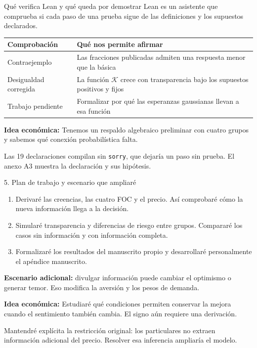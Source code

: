 \documentclass[aspectratio=169,11pt]{beamer}
\newcommand{\idea}[1]{\par\medskip\textbf{Idea económica:} #1}
\begin{document}
\begin{frame}{Qué verifica Lean y qué queda por demostrar}
 Lean es un asistente que comprueba si cada paso de una prueba sigue
 de las definiciones y los supuestos declarados.
 \medskip
 \begin{center}
 \begin{tabular}{p{3.3cm}p{8.9cm}}
 \toprule
 Comprobación & Qué nos permite afirmar\\
 \midrule
 Contraejemplo & Las fracciones publicadas admiten una respuesta menor que la básica\\[0.18cm]
 Desigualdad corregida & La función \(\mathcal K\) crece con transparencia bajo los supuestos positivos y fijos\\[0.18cm]
 Trabajo pendiente & Formalizar por qué las esperanzas gaussianas llevan a esa función\\
 \bottomrule
 \end{tabular}
 \end{center}
 \idea{Tenemos un respaldo algebraico preliminar con cuatro grupos y sabemos qué conexión probabilística falta.}
 \small\par\medskip
 Las 19 declaraciones compilan sin \texttt{sorry}, que dejaría un paso sin prueba.
 El anexo A3 muestra la declaración y sus hipótesis.
\end{frame}
\begin{frame}{5. Plan de trabajo y escenario que ampliaré}
 \begin{enumerate}
  \item Derivaré las creencias, las cuatro FOC y el precio.
        Así comprobaré cómo la nueva información llega a la decisión.
  \item Simularé transparencia y diferencias de riesgo entre grupos.
        Compararé los casos sin información y con información completa.
  \item Formalizaré los resultados del manuscrito propio
        y desarrollaré personalmente el apéndice manuscrito.
 \end{enumerate}
 \medskip
 \par\textbf{Escenario adicional:} divulgar información puede cambiar
 el optimismo o generar temor. Eso modifica la aversión y los pesos de demanda.
 \idea{Estudiaré qué condiciones permiten conservar la mejora cuando el sentimiento también cambia. El signo aún requiere una derivación.}
 \small\par\medskip
 Mantendré explícita la restricción original: los particulares no extraen
 información adicional del precio. Resolver esa inferencia ampliaría el modelo.
\end{frame}
\end{document}
